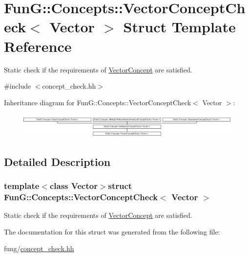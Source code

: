 \hypertarget{structFunG_1_1Concepts_1_1VectorConceptCheck}{}\section{Fun\+G\+:\+:Concepts\+:\+:Vector\+Concept\+Check$<$ Vector $>$ Struct Template Reference}
\label{structFunG_1_1Concepts_1_1VectorConceptCheck}


Static check if the requirements of \hyperlink{structFunG_1_1Concepts_1_1VectorConcept}{Vector\+Concept} are satisfied.  




{\ttfamily \#include $<$concept\+\_\+check.\+hh$>$}

Inheritance diagram for Fun\+G\+:\+:Concepts\+:\+:Vector\+Concept\+Check$<$ Vector $>$\+:\begin{figure}[H]
\begin{center}
\leavevmode
\includegraphics[height=1.287356cm]{structFunG_1_1Concepts_1_1VectorConceptCheck}
\end{center}
\end{figure}


\subsection{Detailed Description}
\subsubsection*{template$<$class Vector$>$struct Fun\+G\+::\+Concepts\+::\+Vector\+Concept\+Check$<$ Vector $>$}

Static check if the requirements of \hyperlink{structFunG_1_1Concepts_1_1VectorConcept}{Vector\+Concept} are satisfied. 

The documentation for this struct was generated from the following file\+:\begin{DoxyCompactItemize}
\item 
fung/\hyperlink{concept__check_8hh}{concept\+\_\+check.\+hh}\end{DoxyCompactItemize}
